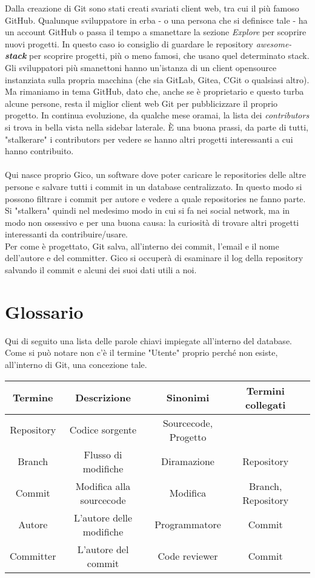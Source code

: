 Dalla creazione di Git sono stati creati svariati client web, tra cui il più famoso GitHub. Qualunque sviluppatore in erba - o una persona che si definisce tale - ha un account GitHub o passa il tempo a smanettare la sezione \textit{Explore} per scoprire nuovi progetti. In questo caso io consiglio di guardare le repository \textit{awesome-\textbf{stack}} per scoprire progetti, più o meno famosi, che usano quel determinato stack. Gli sviluppatori più smanettoni hanno un'istanza di un client opensource instanziata sulla propria macchina (che sia GitLab, Gitea, CGit o qualsiasi altro).\\
Ma rimaniamo in tema GitHub, dato che, anche se è proprietario e questo turba alcune persone, resta il miglior client web Git per pubblicizzare il proprio progetto. In continua evoluzione, da qualche mese oramai, la lista dei \textit{contributors} si trova in bella vista nella sidebar laterale. È una buona prassi, da parte di tutti, "stalkerare" i contributors per vedere se hanno altri progetti interessanti a cui hanno contribuito. \\\\
Qui nasce proprio Gico, un software dove poter caricare le repositories delle altre persone e salvare tutti i commit in un database centralizzato. In questo modo si possono filtrare i commit per autore e vedere a quale repositories ne fanno parte. Si "stalkera" quindi nel medesimo modo in cui si fa nei social network, ma in modo non ossessivo e per una buona causa: la curiosità di trovare altri progetti interessanti da contribuire/usare.\\
Per come è progettato, Git salva, all'interno dei commit, l'email e il nome dell'autore e del committer. Gico si occuperà di esaminare il log della repository salvando il commit e alcuni dei suoi dati utili a noi.
\section{Glossario}
Qui di seguito una lista delle parole chiavi impiegate all'interno del database.\\
Come si può notare non c'è il termine "Utente" proprio perché non esiste, all'interno di Git, una concezione tale.
\begin{center}
\begin{tabular}{ |c|c|c|c|c| } 
\hline
Termine & Descrizione & Sinonimi & Termini collegati \\
\hline
Repository & Codice sorgente & Sourcecode, Progetto & \\
Branch & Flusso di modifiche & Diramazione & Repository \\
Commit & Modifica alla sourcecode & Modifica & Branch, Repository \\
Autore & L'autore delle modifiche & Programmatore & Commit \\
Committer & L'autore del commit & Code reviewer & Commit \\
\hline
\end{tabular}
\end{center}